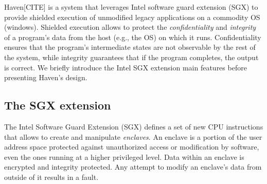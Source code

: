 Haven[CITE] is a system that leverages Intel software guard extension (SGX) to provide shielded execution of unmodified legacy applications on a commodity OS (windows).
Shielded execution allows to protect the \emph{confidentiality} and \emph{integrity} of a program's data from the host (e.g., the OS) on which it runs.
Confidentiality ensures that the program's intermediate states are not observable by the rest of the system, while integrity guarantees that if the program completes, the output is correct.
We briefly introduce the Intel SGX extension main features before presenting Haven's design.



\subsection{The SGX extension}
%

The Intel Software Guard Extension (SGX) defines a set of new CPU instructions that allows to create and manipulate \emph{enclaves}.
An enclave is a portion of the user address space protected against unauthorized access or modification by software, even the ones running at a higher privileged level.
Data within an enclave is encrypted and integrity protected.
Any attempt to modify an enclave's data from outside of it results in a fault.


